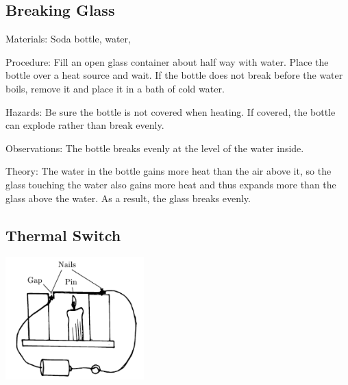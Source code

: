 \begin{multicols}{2}
\columnbreak

\subsection{Breaking Glass}


\begin{description*}
\item[Materials:]{Soda bottle, water, }
\item[Procedure:]{Fill an open glass container about half way with water. Place the bottle over a heat source and wait. If the bottle does not break before the water boils, remove it and place it in a bath of cold water.}
\item[Hazards:]{Be sure the bottle is not covered when heating. If covered, the bottle can explode rather than break evenly.}
\item[Observations:]{The bottle breaks evenly at the level of the water inside.}
\item[Theory:]{The water in the bottle gains more heat than the air above it, so the glass touching the water also gains more heat and thus expands more than the glass above the water. As a result, the glass breaks evenly.}
\end{description*}

\subsection{Thermal Switch}

\begin{center}
\includegraphics[width=0.4\textwidth]{./img/thermal-switch.png}
\end{center}


\end{multicols}
